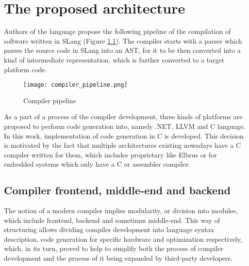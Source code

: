\chapter{The proposed architecture}
\label{chap:met}
  
\lstset{escapechar=@,style=customc}

Authors of the language propose the following pipeline of the compilation of software written in SLang (Figure \ref{fig:compiler_pipeline}). The compiler starts with a parser which parses the source code in SLang into an AST, for it to be then converted into a kind of intermediate representation, which is further converted to a target platform code.

\begin{figure}[h!]
    \centering
    \texttt{[image: compiler\_pipeline.png]}
    \caption{Compiler pipeline}
    \label{fig:compiler_pipeline}
\end{figure}

As a part of a process of the compiler development, three kinds of platforms are proposed to perform code generation into, namely .NET, LLVM and C language. In this work, implementation of code generation in C is developed. This decision is motivated by the fact that multiple architectures existing nowadays have a C compiler written for them, which includes proprietary like Elbrus \cite{Elbrus} or for embedded systems which only have a C or assembler compiler.

\section{Compiler frontend, middle-end and backend}
The notion of a modern compiler implies modularity, or division into modules, which include frontend, backend and sometimes middle-end. This way of structuring allows dividing compiler development into language syntax description, code generation for specific hardware and optimization respectively, which, in its turn, proved to help to simplify both the process of compiler development and the process of it being expanded by third-party developers.

